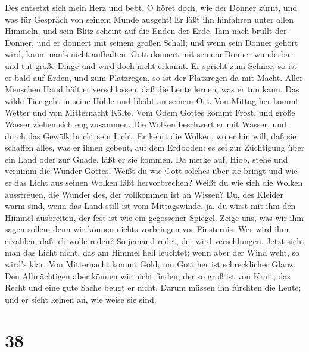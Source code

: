  Des entsetzt sich mein Herz und bebt.  O höret
doch, wie der Donner zürnt, und was für Gespräch von seinem Munde
ausgeht!  Er läßt ihn hinfahren unter allen Himmeln, und
sein Blitz scheint auf die Enden der Erde.  Ihm nach brüllt
der Donner, und er donnert mit seinem großen Schall; und wenn sein
Donner gehört wird, kann man's nicht aufhalten.  Gott
donnert mit seinem Donner wunderbar und tut große Dinge und wird doch
nicht erkannt.  Er spricht zum Schnee, so ist er bald auf
Erden, und zum Platzregen, so ist der Platzregen da mit Macht.
 Aller Menschen Hand hält er verschlossen, daß die Leute
lernen, was er tun kann.  Das wilde Tier geht in seine Höhle
und bleibt an seinem Ort.  Von Mittag her kommt Wetter und
von Mitternacht Kälte.  Vom Odem Gottes kommt Frost, und
große Wasser ziehen sich eng zusammen.  Die Wolken
beschwert er mit Wasser, und durch das Gewölk bricht sein Licht.
 Er kehrt die Wolken, wo er hin will, daß sie schaffen
alles, was er ihnen gebeut, auf dem Erdboden:  es sei zur
Züchtigung über ein Land oder zur Gnade, läßt er sie kommen.
 Da merke auf, Hiob, stehe und vernimm die Wunder Gottes!
 Weißt du wie Gott solches über sie bringt und wie er das
Licht aus seinen Wolken läßt hervorbrechen?  Weißt du wie
sich die Wolken ausstreuen, die Wunder des, der vollkommen ist an
Wissen?  Du, des Kleider warm sind, wenn das Land still ist
vom Mittagswinde,  ja, du wirst mit ihm den Himmel
ausbreiten, der fest ist wie ein gegossener Spiegel.  Zeige
uns, was wir ihm sagen sollen; denn wir können nichts vorbringen vor
Finsternis.  Wer wird ihm erzählen, daß ich wolle reden? So
jemand redet, der wird verschlungen.  Jetzt sieht man das
Licht nicht, das am Himmel hell leuchtet; wenn aber der Wind weht, so
wird's klar.  Von Mitternacht kommt Gold; um Gott her ist
schrecklicher Glanz.  Den Allmächtigen aber können wir
nicht finden, der so groß ist von Kraft; das Recht und eine gute Sache
beugt er nicht.  Darum müssen ihn fürchten die Leute; und
er sieht keinen an, wie weise sie sind.

\hypertarget{section-37}{%
\section{38}\label{section-37}}

